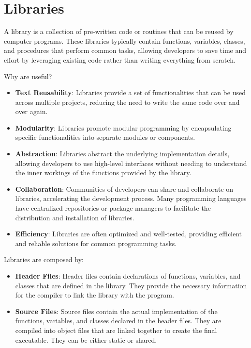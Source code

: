 
\chapter{Libraries}

\begin{definitionblock}
    A library is a collection of pre-written code or routines that can be reused by computer programs.
    These libraries typically contain functions, variables, classes, and procedures that perform
    common tasks, allowing developers to save time and effort by leveraging existing code rather than
    writing everything from scratch.
\end{definitionblock}

Why are useful? 
\begin{itemize}
    \item \textbf{Text Reusability}: Libraries provide a set of functionalities that can be used across multiple
    projects, reducing the need to write the same code over and over again.
    \item \textbf{Modularity}: Libraries promote modular programming by encapsulating specific functionalities
    into separate modules or components.
    \item \textbf{Abstraction}: Libraries abstract the underlying implementation details, allowing developers to
    use high-level interfaces without needing to understand the inner workings of the functions
    provided by the library.
    \item \textbf{Collaboration}: Communities of developers can share and collaborate on libraries,
    accelerating the development process. Many programming languages have centralized
    repositories or package managers to facilitate the distribution and installation of libraries.
    \item \textbf{Efficiency}: Libraries are often optimized and well-tested, providing efficient and reliable
    solutions for common programming tasks.
\end{itemize}

Libraries are composed by:
\begin{itemize}
    \item \textbf{Header Files}: Header files contain declarations of functions, variables, and classes that are
    defined in the library. They provide the necessary information for the compiler to link the
    library with the program.
    \item \textbf{Source Files}: Source files contain the actual implementation of the functions, variables, and
    classes declared in the header files. They are compiled into object files that are linked together
    to create the final executable. They can be either static or shared. 
\end{itemize}

